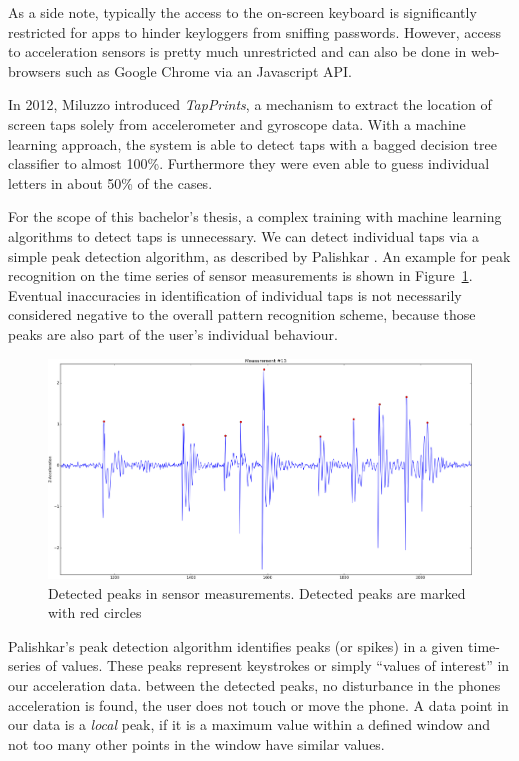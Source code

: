 As a side note, typically the access to the on-screen keyboard is significantly restricted for \glspl{app} to hinder keyloggers from sniffing passwords. However, access to acceleration sensors is pretty much unrestricted and can also be done in web-browsers such as Google Chrome via an Javascript API\cite{devicemotionjavascript}.

In 2012, Miluzzo \etal\cite{miluzzo2012tapprints} introduced \emph{TapPrints}, a mechanism to extract the location of screen taps solely from accelerometer and gyroscope data. With a machine learning approach, the system is able to detect taps with a bagged decision tree classifier to almost 100\%. Furthermore they were even able to guess individual letters in about 50\% of the cases.

For the scope of this bachelor's thesis, a complex training with machine learning algorithms to detect taps is unnecessary. We can detect individual taps via a simple peak detection algorithm, as described by Palishkar \etal\cite{palshikar2009simple}. An example for peak recognition on the time series of sensor measurements is shown in Figure~\ref{fig:peakdetection}. Eventual inaccuracies in identification of individual taps is not necessarily considered negative to the overall pattern recognition scheme, because those peaks are also part of the user's individual behaviour.

\begin{figure}
    \centering
    \includegraphics[width=\linewidth]{figures/detectedPeaks.png}
    \caption{Detected peaks in sensor measurements. Detected peaks are marked with red circles}
    \label{fig:peakdetection}
\end{figure}

Palishkar's peak detection algorithm identifies peaks (or spikes) in a given time-series of values. These peaks represent keystrokes or simply ``values of interest'' in our acceleration data. between the detected peaks, no disturbance in the phones acceleration is found, \ie the user does not touch or move the phone. A data point in our data is a \emph{local} peak, if it is a maximum value within a defined window and not too many other points in the window have similar values.

